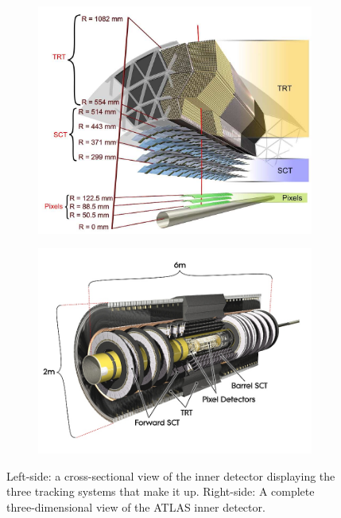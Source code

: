 \begin{figure}[!hbpt]
  \centering
  \begin{subfigure}[b]{0.45\textwidth}
      \includegraphics[scale=0.5, angle=0]{figures/id_perspective_layout}
      \caption{}
      \label{fig:idperspective}
  \end{subfigure}
  \quad
  \begin{subfigure}[b]{0.45\textwidth}
  \centering
    \includegraphics[scale=0.3, angle=0]{figures/Inner_detector}
    \caption{}
    \label{fig:id}
  \end{subfigure}
  \caption{Left-side:
  a cross-sectional view of the inner detector displaying the three tracking
  systems that make it up. Right-side: A complete three-dimensional view
  of the ATLAS inner detector.}
  \label{fig:innerdetector}
\end{figure}

